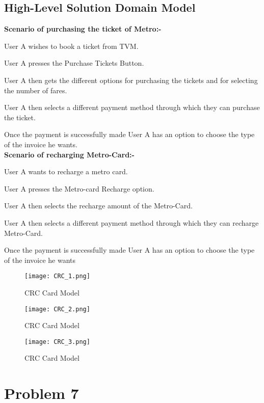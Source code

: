 \documentclass[a4paper,12pt]{report}
\begin{document}
\section{High-Level Solution Domain Model}

\textbf{Scenario of purchasing the ticket of Metro:-}
\item User A wishes to book a ticket from TVM.
\item User A presses the Purchase Tickets Button.
\item User A then gets the different options for purchasing the tickets and for selecting the number of fares.
\item User A then selects a different payment method through which they can purchase the ticket.
\item Once the payment is successfully made User A has an option to choose the type of the invoice he wants.\\


\hspace{-17}\textbf{Scenario of recharging Metro-Card:-}
\item User A wants to recharge a metro card.
\item User A presses the Metro-card Recharge option.
\item User A then selects the recharge amount of the Metro-Card.
\item User A then selects a different payment method through which they can recharge Metro-Card.
\item Once the payment is successfully made User A has an option to choose the type of the invoice he wants

\begin{figure}[h!]
  \centering
   \texttt{[image: CRC\_1.png]}
  \caption{CRC Card Model}
\end{figure}

\begin{figure}[h!]
  \centering
   \texttt{[image: CRC\_2.png]}
  \caption{CRC Card Model}
\end{figure}

\begin{figure}[h!]
  \centering
   \texttt{[image: CRC\_3.png]}
  \caption{CRC Card Model}
\end{figure}

\chapter {Problem 7}
\end{document}
